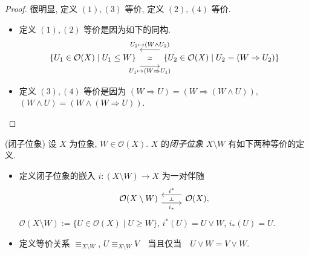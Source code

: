 \begin{proof}
	很明显, 定义 $(1),(3)$ 等价, 定义 $(2),(4)$ 等价.
	\begin{itemize}
		\item 定义 $(1),(2)$ 等价是因为如下的同构.
		\[\begin{tikzcd}[ampersand replacement=\&]
			{\{U_1\in\mathcal O(X)\mid U_1\leq W\}} \& {\{U_2\in\mathcal O(X)\mid U_2=(W\Rightarrow U_2)\}}
			\arrow[""{name=0, anchor=center, inner sep=0}, "{U_1\mapsto (W\Rightarrow U_1)}"', shift right=4, from=1-1, to=1-2]
			\arrow[""{name=1, anchor=center, inner sep=0}, "{U_2\mapsto (W\land U_2)}"', shift right=4, from=1-2, to=1-1]
			\arrow["\simeq"{description}, draw=none, from=0, to=1]
		\end{tikzcd}\]
		\item 定义 $(3),(4)$ 等价是因为 $(W\Rightarrow U) = (W\Rightarrow (W\land U))$,
		$(W\land U) = (W\land (W\Rightarrow U))$.
	\end{itemize}
\end{proof}

\begin{definition}
	{(闭子位象)}
	设 $X$ 为位象, $W\in\mathcal O(X)$. $X$ 的\emph{闭子位象} $X\setminus W$ 有如下两种等价的定义.
	\begin{itemize}
		\item 定义闭子位象的嵌入 $i\colon (X\setminus W)\to X$ 为一对伴随
		$$\begin{tikzcd}[ampersand replacement=\&]
			{\mathcal O(X\setminus W)} \& {\mathcal O(X),}
			\arrow[""{name=0, anchor=center, inner sep=0}, "{i^*}"', shift right=2, from=1-2, to=1-1]
			\arrow[""{name=1, anchor=center, inner sep=0}, "{i_*}"', shift right=2, from=1-1, to=1-2]
			\arrow["\dashv"{anchor=center, rotate=-90}, draw=none, from=0, to=1]
		\end{tikzcd}$$
		$\mathcal O(X\setminus W) := \{U\in\mathcal O(X)\mid U\geq W\}$, $i^* (U) = U\lor W$, $i_*(U)=U$.
		\item 定义等价关系 $\equiv_{X\setminus W}$,
		$U\equiv_{X\setminus W} V \quad\text{当且仅当}\quad
		U\lor W = V\lor W$.
	\end{itemize}
\end{definition}



